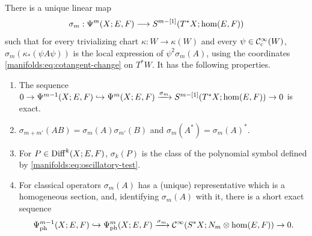 \begin{proposition}\label{manifolds:prop:principal-symbol}
There is a unique linear map
\begin{equation*}
\sigma_m:\Psi^{m}(X;E,F)\longrightarrow S^{m-[1]}(T^*X;\hom(E,F))
\end{equation*}
such that for every trivializing chart $\kappa:W\to\kappa(W)$ and every
$\psi\in\mathcal{C}^\infty_{\mathrm{c}}(W)$, $\sigma_m(\kappa_*(\psi A\psi))$ is the local expression of
$\psi^2\sigma_m(A)$, using the coordinates \eqref{manifolds:eq:cotangent-change}
on $T^*W$. It has the following properties.
\begin{enumerate}[label=\textup{(\alph*)}]
\item The sequence
$0\to\Psi^{m-1}(X;E,F)\hookrightarrow\Psi^{m}(X;E,F)\xrightarrow{\sigma_m}S^{m-[1]}(T^*X;\hom(E,F))\to0$
is exact.
\item $\sigma_{m+m'}(AB)=\sigma_m(A)\sigma_{m'}(B)$ and $\sigma_m(A^*)=\sigma_m(A)^*$.
\item For $P\in\operatorname{Diff}^{k}(X;E,F)$, $\sigma_k(P)$ is the class of the polynomial
symbol defined by \eqref{manifolds:eq:oscillatory-test}.
\item For classical operators $\sigma_m(A)$ has a (unique) representative which is a
homogeneous section, and, identifying $\sigma_m(A)$ with it, there is a
short exact sequence
\begin{equation*}
\Psi^{m-1}_{\mathrm{ph}}(X;E,F)\hookrightarrow\Psi^{m}_{\mathrm{ph}}(X;E,F)
\xrightarrow{\sigma_m}\mathcal{C}^\infty(S^*X;N_m\otimes\hom(E,F))\to0.
\end{equation*}
\end{enumerate}
\end{proposition}
